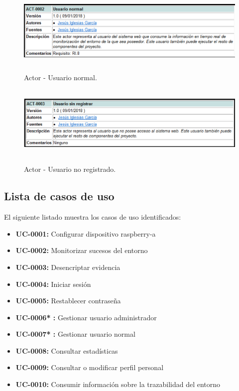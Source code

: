 \documentclass[12pt,a4paper, twoside]{report}
\begin{document}
	\newpage
	
	\begin{figure}[!ht]   
		\caption{Actor - Usuario normal.} 
		\begin{center} 
	 		\includegraphics[width=14cm,height=3.5cm]{Images/analysis/actors/actor_normal} \\
			\label{fig:actor_02} 
		\end{center}  
	\end{figure} 
	
	\begin{figure}[!ht]   
		\caption{Actor - Usuario no registrado.} 
		\begin{center} 
	 		\includegraphics[width=14cm,height=3.5cm]{Images/analysis/actors/actor_noregistrado} \\
			\label{fig:actor_03} 
		\end{center}  
	\end{figure} 
	
	\subsection{Lista de casos de uso} \label{UClist}
	
	El siguiente listado muestra los casos de uso identificados:
	
	\begin{itemize}
		\item \textbf{UC-0001:} Configurar dispositivo \gls{raspberry-a}
		\item \textbf{UC-0002:} Monitorizar sucesos del entorno
		\item \textbf{UC-0003:} Desencriptar evidencia
		\item \textbf{UC-0004:} Iniciar sesión
		\item \textbf{UC-0005:} Restablecer contraseña 
		\item \textbf{UC-0006{\color{black!40!blue}*} :} Gestionar usuario administrador
		\item \textbf{UC-0007{\color{black!40!blue}*} :} Gestionar usuario normal
		\item \textbf{UC-0008:} Consultar estadísticas
		\item \textbf{UC-0009:} Consultar o modificar perfil personal
		\item \textbf{UC-0010:} Consumir información sobre la trazabilidad del entorno
	\end{itemize}
	
\end{document}
